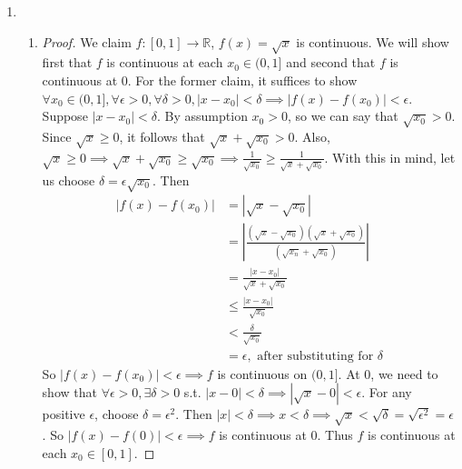 \documentclass{article}
\begin{document}
\begin{enumerate}
    \color{Red}
    The proof arrives at the same choice of $\delta$ ($\min\{1,\,\frac{\epsilon}{1+3|x_0|+3|x_0|^2}\}$) 
    for an $\epsilon$-$\delta$ proof of uniformy continuity with same reasoning 
    for choosing such a $\delta$. 5/5
    \color{Black}

    \item {} 
    \begin{enumerate}
      \item \begin{proof} We claim $f:[0, 1]\to\mathbb{R}$, $f(x) = \sqrt{x}$
      is continuous. We will show first that $f$ is continuous at each $x_0\in(0, 1]$
      and second that $f$ is continuous at $0$. 
      For the former claim, it suffices to show
      $\forall x_0\in(0,1], \forall \epsilon>0, \forall \delta > 0,
      |x-x_0| < \delta \implies |f(x)-f(x_0)|<\epsilon$.
      Suppose $|x-x_0| < \delta$.
      By assumption $x_0 > 0$, so we can say that $\sqrt{x_0} > 0$.
      Since $\sqrt{x} \geq 0$, it follows that $\sqrt{x} + \sqrt{x_0} > 0$.
      Also, $\sqrt{x} \geq 0 \implies \sqrt{x} + \sqrt{x_0} \geq \sqrt{x_0} \implies 
      \frac{1}{\sqrt{x_0}} \geq \frac{1}{\sqrt{x} + \sqrt{x_0}}$.
      With this in mind, let us choose $\delta = \epsilon\sqrt{x_0}$. Then
      \begin{align*}
        |f(x)-f(x_0)| &= |\sqrt{x} - \sqrt{x_0}|\\
        &= \left|\frac{(\sqrt{x}-\sqrt{x_0})(\sqrt{x}+\sqrt{x_0})}{(\sqrt{x_n}+\sqrt{x_0})}\right|\\
        &= \frac{|x-x_0|}{\sqrt{x}+\sqrt{x_0}}\\
        &\leq\frac{|x - x_0|}{\sqrt{x_0}}\\
        &<\frac{\delta}{\sqrt{x_0}}\\
        &=\epsilon, \text{ after substituting for $\delta$}
      \end{align*}
      So $|f(x)-f(x_0)|<\epsilon \implies f$ is continuous on $(0, 1]$. 
      At 0, we need to show that $\forall \epsilon > 0, \exists \delta > 0$
      s.t. $|x - 0| < \delta \implies |\sqrt{x} - 0| < \epsilon$.
      For any positive $\epsilon$, choose $\delta=\epsilon^2$. 
      Then $|x|<\delta\implies x < \delta \implies \sqrt{x} < \sqrt{\delta} = \sqrt{\epsilon^2} = \epsilon$.
      So $|f(x)-f(0)| < \epsilon \implies f$ is continuous at 0. Thus $f$ is continuous at each
      $x_0\in[0,1]$.
      \end{proof}


\end{enumerate}
\end{enumerate}
\end{document}

